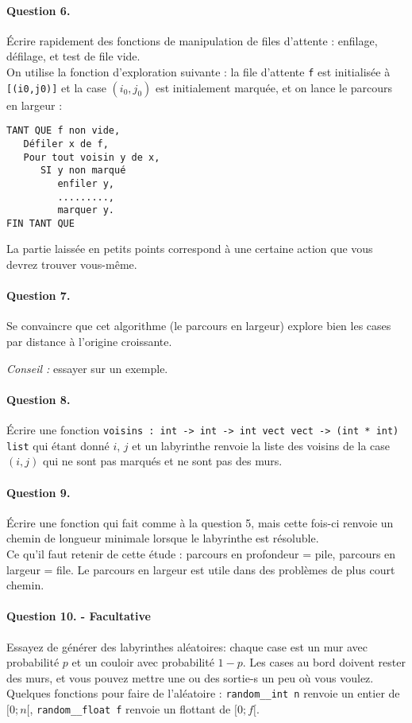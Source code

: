 \documentclass[10pt,a4paper]{article}
\begin{document}
\paragraph{Question 6.} Écrire rapidement des fonctions de manipulation de files
d'attente : enfilage, défilage, et test de file vide.
\\

On utilise la fonction d'exploration suivante : la file d'attente \texttt{f} est
initialisée à \texttt{[(i0,j0)]} et la case $(i_0, j_0)$ est initialement
marquée, et on lance le parcours en largeur :
\begin{verbatim}TANT QUE f non vide,
   Défiler x de f,
   Pour tout voisin y de x,
      SI y non marqué
         enfiler y,
         .........,
         marquer y.
FIN TANT QUE
\end{verbatim}
La partie laissée en petits points correspond à une certaine action que vous
devrez trouver vous-même.

\paragraph{Question 7.} Se convaincre que cet algorithme (le parcours en largeur)
explore bien les cases par distance à l'origine croissante.

\textit{Conseil :} essayer sur un exemple.

\paragraph{Question 8.} Écrire une fonction \texttt{voisins : int -> int -> int vect vect -> (int * int) list} qui étant donné $i$, $j$ et un labyrinthe renvoie la liste
des voisins de la case $(i,j)$ qui ne sont pas marqués et ne sont pas des murs.

\paragraph{Question 9.} Écrire une fonction qui fait comme à la question 5, mais
cette fois-ci renvoie un chemin de longueur minimale lorsque le labyrinthe est
résoluble.
\\

Ce qu'il faut retenir de cette étude : parcours en profondeur = pile, parcours en
largeur = file. Le parcours en largeur est utile dans des problèmes de plus court chemin.
\paragraph{Question 10. - Facultative}
Essayez de générer des labyrinthes aléatoires: chaque case est un mur avec
probabilité $p$ et un couloir avec probabilité $1-p$. Les cases au bord doivent
rester des murs, et vous pouvez mettre une ou des sortie-s un peu où vous voulez.
Quelques fonctions pour faire de l'aléatoire : \texttt{random\_\_int n} renvoie un
entier de $[0;n[$, \texttt{random\_\_float f} renvoie un flottant de $[0;f[$.
\end{document}

